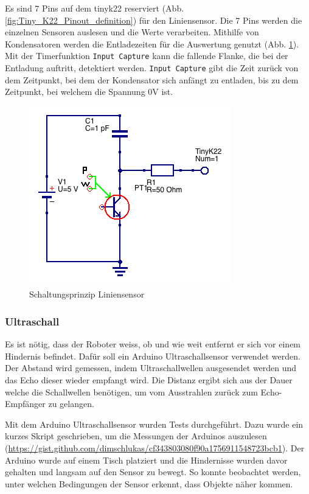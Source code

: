 Es sind 7 Pins auf dem \gls{tinyk22} reserviert (Abb. \ref{fig:Tiny_K22_Pinout_definition}) für den Liniensensor. Die 7 Pins werden die einzelnen Sensoren auslesen und die Werte verarbeiten. Mithilfe von Kondensatoren werden die Entladezeiten für die Auswertung genutzt (Abb. \ref{fig:Liniensensor_Schaltung}). Mit der Timerfunktion \verb|Input Capture| kann die fallende Flanke, die bei der Entladung auftritt, detektiert werden. \verb|Input Capture| gibt die Zeit zurück von dem Zeitpunkt, bei dem der Kondensator sich anfängt zu entladen, bis zu dem Zeitpunkt, bei welchem die Spannung 0V ist.

\begin{figure}[H]
    \centering
    \includegraphics[width=0.4\linewidth]{img/Liniensensor_Schaltung.png}
    \caption{Schaltungsprinzip Liniensensor}
    \label{fig:Liniensensor_Schaltung}
\end{figure}

\subsubsection*{Ultraschall}

Es ist nötig, dass der Roboter weiss, ob und wie weit entfernt er sich vor einem Hindernis befindet. Dafür soll ein Arduino Ultraschallsensor verwendet werden. Der Abstand wird gemessen, indem Ultraschallwellen ausgesendet werden und das Echo dieser wieder empfangt wird. Die Distanz ergibt sich aus der Dauer welche die Schallwellen benötigen, um vom Ausstrahlen zurück zum Echo-Empfänger zu gelangen.

Mit dem Arduino Ultraschallsensor wurden Tests durchgeführt. Dazu wurde ein kurzes Skript geschrieben, um die Messungen der Arduinos auszulesen (\url{https://gist.github.com/dimschlukas/cf343803080f90a1756911548723bcb1}). Der Arduino wurde auf einem Tisch platziert und die Hindernisse wurden davor gehalten und langsam auf den Sensor zu bewegt. So konnte beobachtet werden, unter welchen Bedingungen der Sensor erkennt, dass Objekte näher kommen.

